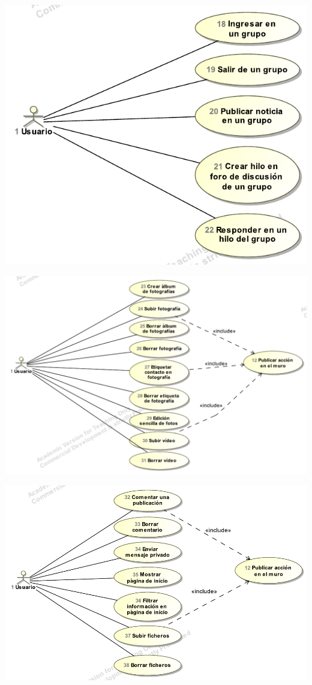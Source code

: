 \documentclass[12pt, a4paper, titlepage]{article}
\begin{document}
\begin{center}
\includegraphics[scale=0.95]{Imagenes/casosUso3}
\end{center}

\vspace{2cm}
\begin{center}
\includegraphics[width=\textwidth]{Imagenes/casosUso4}
\end{center}

\begin{center}
\includegraphics[width=\textwidth]{Imagenes/casosUso5}
\end{center}
\end{document}
